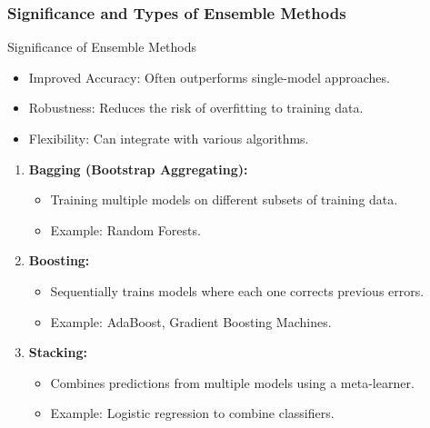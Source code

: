\documentclass[aspectratio=169]{beamer}
\begin{document}
\begin{frame}[fragile]
    \frametitle{Significance and Types of Ensemble Methods}
    
    \begin{block}{Significance of Ensemble Methods}
        \begin{itemize}
            \item Improved Accuracy: Often outperforms single-model approaches.
            \item Robustness: Reduces the risk of overfitting to training data.
            \item Flexibility: Can integrate with various algorithms.
        \end{itemize}
    \end{block}
    
    \begin{enumerate}
        \item \textbf{Bagging (Bootstrap Aggregating):}
            \begin{itemize}
                \item Training multiple models on different subsets of training data.
                \item Example: Random Forests.
            \end{itemize}

        \item \textbf{Boosting:}
            \begin{itemize}
                \item Sequentially trains models where each one corrects previous errors.
                \item Example: AdaBoost, Gradient Boosting Machines.
            \end{itemize}

        \item \textbf{Stacking:}
            \begin{itemize}
                \item Combines predictions from multiple models using a meta-learner.
                \item Example: Logistic regression to combine classifiers.
            \end{itemize}
    \end{enumerate}
\end{frame}
\end{document}
